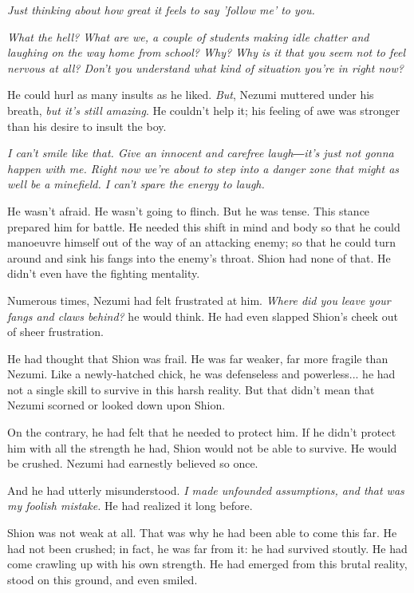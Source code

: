 \emph{Just thinking about how great it feels to say 'follow me' to you.}

\emph{What the hell? What are we, a couple of students making idle chatter and
	laughing on the way home from school? Why? Why is it that you seem not
	to feel nervous at all? Don't you understand what kind of situation
	you're in right now?}

He could hurl as many insults as he liked. \emph{But}, Nezumi muttered under
his breath, \emph{but it's still amazing}. He couldn't help it; his feeling of
awe was stronger than his desire to insult the boy.

\emph{I can't smile like that. Give an innocent and carefree laugh―it's just
	not gonna happen with me. Right now we're about to step into a danger
	zone that might as well be a minefield. I can't spare the energy to
	laugh.}

He wasn't afraid. He wasn't going to flinch. But he was tense. This
stance prepared him for battle. He needed this shift in mind and body so
that he could manoeuvre himself out of the way of an attacking enemy; so
that he could turn around and sink his fangs into the enemy's throat.
Shion had none of that. He didn't even have the fighting mentality.

Numerous times, Nezumi had felt frustrated at him. \emph{Where did you leave
	your fangs and claws behind?} he would think. He had even slapped Shion's
cheek out of sheer frustration.

He had thought that Shion was frail. He was far weaker, far more fragile
than Nezumi. Like a newly-hatched chick, he was defenseless and
powerless... he had not a single skill to survive in this harsh reality.
But that didn't mean that Nezumi scorned or looked down upon Shion.

On the contrary, he had felt that he needed to protect him. If he didn't
protect him with all the strength he had, Shion would not be able to
survive. He would be crushed. Nezumi had earnestly believed so once.

And he had utterly misunderstood. \emph{I made unfounded assumptions, and that
	was my foolish mistake.} He had realized it long before.

Shion was not weak at all. That was why he had been able to come this
far. He had not been crushed; in fact, he was far from it: he had
survived stoutly. He had come crawling up with his own strength. He had
emerged from this brutal reality, stood on this ground, and even smiled.

